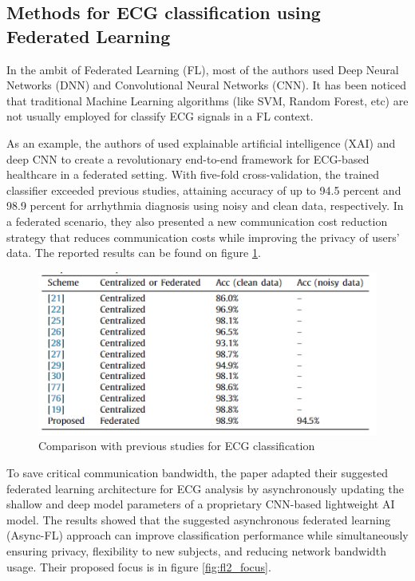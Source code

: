 \subsection{Methods for ECG classification using Federated Learning}

In the ambit of Federated Learning (FL), most of the authors used Deep Neural Networks (DNN) and Convolutional Neural Networks (CNN). It has been noticed that traditional Machine Learning algorithms (like SVM, Random Forest, etc) are not usually employed for classify ECG signals in a FL context.

As an example, the authors of \cite{metrics_ecg1} used explainable artificial intelligence (XAI) and deep CNN to create a revolutionary end-to-end framework for ECG-based healthcare in a federated setting. With five-fold cross-validation, the trained classifier exceeded previous studies, attaining accuracy of up to 94.5 percent and 98.9 percent for arrhythmia diagnosis using noisy and clean data, respectively. In a federated scenario, they also presented a new communication cost reduction strategy that reduces communication costs while improving the privacy of users' data. The reported results can be found on figure \ref{fig:metrics_ecg1_results}.

\begin{figure}[H]
\centering
\includegraphics[scale=0.7]{img/metrics_ecg1_results.PNG}
\caption{Comparison with previous studies for ECG classification \cite{metrics_ecg1}}
\label{fig:metrics_ecg1_results}
\end{figure}

To save critical communication bandwidth, the paper \cite{fl2} adapted their suggested federated learning architecture for ECG analysis by asynchronously updating the shallow and deep model parameters of a proprietary CNN-based lightweight AI model. The results showed that the suggested asynchronous federated learning (Async-FL) approach can improve classification performance while simultaneously ensuring privacy, flexibility to new subjects, and reducing network bandwidth usage. Their proposed focus is in figure \ref{fig:fl2_focus}.

